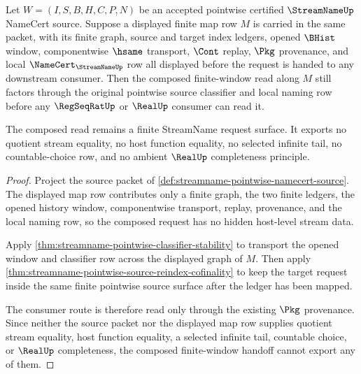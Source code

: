 \begin{theorem}
\label{thm:streamname-pointwise-map-composition-window}
Let $W=(I,S,B,H,C,P,N)$ be an accepted pointwise certified $\StreamNameUp$ NameCert source. Suppose a displayed finite map row $M$ is carried in the same packet, with its finite graph, source and target index ledgers, opened $\BHist$ window, componentwise $\hsame$ transport, $\Cont$ replay, $\Pkg$ provenance, and local $\NameCert_{\StreamNameUp}$ row all displayed before the request is handed to any downstream consumer. Then the composed finite-window read along $M$ still factors through the original pointwise source classifier and local naming row before any $\RegSeqRatUp$ or $\RealUp$ consumer can read it.

The composed read remains a finite StreamName request surface. It exports no quotient stream equality, no host function equality, no selected infinite tail, no countable-choice row, and no ambient $\RealUp$ completeness principle.
\end{theorem}
\begin{proof}
Project the source packet of \autoref{def:streamname-pointwise-namecert-source}. The displayed map row contributes only a finite graph, the two finite ledgers, the opened history window, componentwise transport, replay, provenance, and the local naming row, so the composed request has no hidden host-level stream data.

Apply \autoref{thm:streamname-pointwise-classifier-stability} to transport the opened window and classifier row across the displayed graph of $M$. Then apply \autoref{thm:streamname-pointwise-source-reindex-cofinality} to keep the target request inside the same finite pointwise source surface after the ledger has been mapped.

The consumer route is therefore read only through the existing $\Pkg$ provenance. Since neither the source packet nor the displayed map row supplies quotient stream equality, host function equality, a selected infinite tail, countable choice, or $\RealUp$ completeness, the composed finite-window handoff cannot export any of them.
\end{proof}
